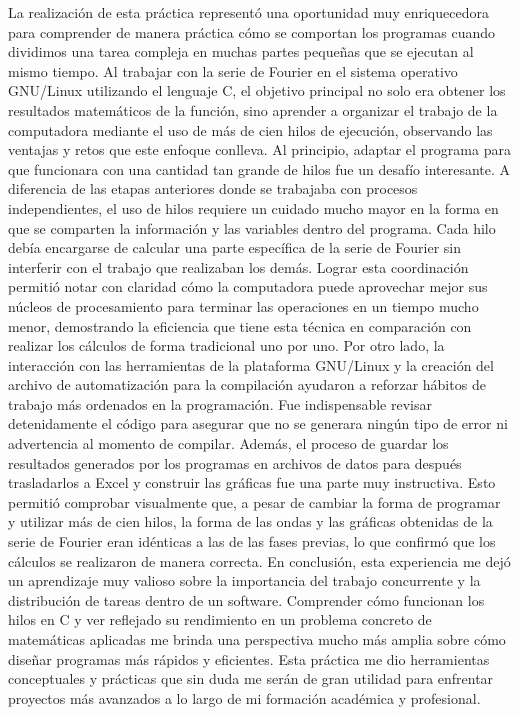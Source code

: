 La realización de esta práctica representó una oportunidad muy enriquecedora para comprender de manera práctica cómo se comportan los programas cuando dividimos una tarea compleja en muchas partes pequeñas que se ejecutan al mismo tiempo. Al trabajar con la serie de Fourier en el sistema operativo GNU/Linux utilizando el lenguaje C, el objetivo principal no solo era obtener los resultados matemáticos de la función, sino aprender a organizar el trabajo de la computadora mediante el uso de más de cien hilos de ejecución, observando las ventajas y retos que este enfoque conlleva.
Al principio, adaptar el programa para que funcionara con una cantidad tan grande de hilos fue un desafío interesante. A diferencia de las etapas anteriores donde se trabajaba con procesos independientes, el uso de hilos requiere un cuidado mucho mayor en la forma en que se comparten la información y las variables dentro del programa. Cada hilo debía encargarse de calcular una parte específica de la serie de Fourier sin interferir con el trabajo que realizaban los demás. Lograr esta coordinación permitió notar con claridad cómo la computadora puede aprovechar mejor sus núcleos de procesamiento para terminar las operaciones en un tiempo mucho menor, demostrando la eficiencia que tiene esta técnica en comparación con realizar los cálculos de forma tradicional uno por uno.
Por otro lado, la interacción con las herramientas de la plataforma GNU/Linux y la creación del archivo de automatización para la compilación ayudaron a reforzar hábitos de trabajo más ordenados en la programación. Fue indispensable revisar detenidamente el código para asegurar que no se generara ningún tipo de error ni advertencia al momento de compilar. Además, el proceso de guardar los resultados generados por los programas en archivos de datos para después trasladarlos a Excel y construir las gráficas fue una parte muy instructiva. Esto permitió comprobar visualmente que, a pesar de cambiar la forma de programar y utilizar más de cien hilos, la forma de las ondas y las gráficas obtenidas de la serie de Fourier eran idénticas a las de las fases previas, lo que confirmó que los cálculos se realizaron de manera correcta.
En conclusión, esta experiencia me dejó un aprendizaje muy valioso sobre la importancia del trabajo concurrente y la distribución de tareas dentro de un software. Comprender cómo funcionan los hilos en C y ver reflejado su rendimiento en un problema concreto de matemáticas aplicadas me brinda una perspectiva mucho más amplia sobre cómo diseñar programas más rápidos y eficientes. Esta práctica me dio herramientas conceptuales y prácticas que sin duda me serán de gran utilidad para enfrentar proyectos más avanzados a lo largo de mi formación académica y profesional.
